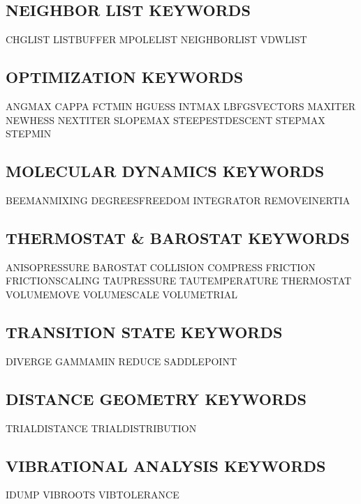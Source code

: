 \documentclass[letterpaper,11pt,english]{sphinxmanual}
\begin{document}
\subsection{NEIGHBOR LIST KEYWORDS}
\label{\detokenize{text/keywords:neighbor-list-keywords}}
CHG\sphinxhyphen{}LIST        LIST\sphinxhyphen{}BUFFER     MPOLE\sphinxhyphen{}LIST
NEIGHBOR\sphinxhyphen{}LIST   VDW\sphinxhyphen{}LIST


\subsection{OPTIMIZATION KEYWORDS}
\label{\detokenize{text/keywords:optimization-keywords}}
ANGMAX  CAPPA   FCTMIN
HGUESS  INTMAX  LBFGS\sphinxhyphen{}VECTORS
MAXITER NEWHESS NEXTITER
SLOPEMAX        STEEPEST\sphinxhyphen{}DESCENT        STEPMAX
STEPMIN


\subsection{MOLECULAR DYNAMICS KEYWORDS}
\label{\detokenize{text/keywords:molecular-dynamics-keywords}}
BEEMAN\sphinxhyphen{}MIXING   DEGREES\sphinxhyphen{}FREEDOM INTEGRATOR
REMOVE\sphinxhyphen{}INERTIA


\subsection{THERMOSTAT \& BAROSTAT KEYWORDS}
\label{\detokenize{text/keywords:thermostat-barostat-keywords}}
ANISO\sphinxhyphen{}PRESSURE  BAROSTAT        COLLISION
COMPRESS        FRICTION        FRICTION\sphinxhyphen{}SCALING
TAU\sphinxhyphen{}PRESSURE    TAU\sphinxhyphen{}TEMPERATURE THERMOSTAT
VOLUME\sphinxhyphen{}MOVE     VOLUME\sphinxhyphen{}SCALE    VOLUME\sphinxhyphen{}TRIAL


\subsection{TRANSITION STATE KEYWORDS}
\label{\detokenize{text/keywords:transition-state-keywords}}
DIVERGE GAMMAMIN        REDUCE
SADDLEPOINT


\subsection{DISTANCE GEOMETRY KEYWORDS}
\label{\detokenize{text/keywords:distance-geometry-keywords}}
TRIAL\sphinxhyphen{}DISTANCE  TRIAL\sphinxhyphen{}DISTRIBUTION


\subsection{VIBRATIONAL ANALYSIS KEYWORDS}
\label{\detokenize{text/keywords:vibrational-analysis-keywords}}
IDUMP   VIB\sphinxhyphen{}ROOTS       VIB\sphinxhyphen{}TOLERANCE
\end{document}
